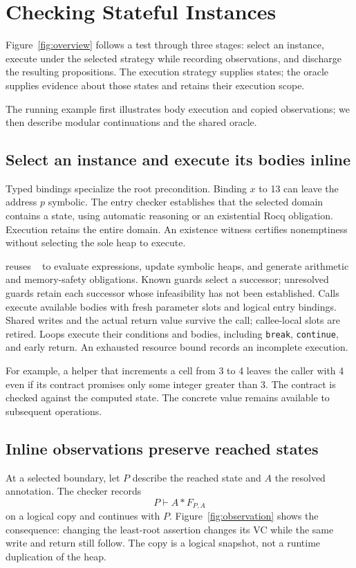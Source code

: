 \section{Checking Stateful Instances}
\label{sec:approach}
Figure~\ref{fig:overview} follows a test through three stages: select an
instance, execute under the selected strategy while recording observations, and discharge
the resulting propositions. The execution strategy supplies states; the oracle
supplies evidence about those states and retains their execution scope.

The running example first illustrates body execution and copied observations;
we then describe modular continuations and the shared oracle.

\subsection{Select an instance and execute its bodies inline}
Typed bindings specialize the root precondition. Binding $x$ to 13 can
leave the address $p$ symbolic. The entry checker establishes that the
selected domain contains a state, using automatic reasoning or an
existential Rocq obligation. Execution retains the entire domain.
An existence witness certifies nonemptiness without selecting the sole
heap to execute.

\tespec{} reuses \qcp{}~\cite{wu2026qcp} to evaluate expressions, update symbolic heaps,
and generate arithmetic and memory-safety obligations.
Known guards select a successor; unresolved guards retain each successor
whose infeasibility has not been established.
Calls execute available bodies with fresh parameter slots and logical
entry bindings. Shared writes and the actual return value survive the
call; callee-local slots are retired. Loops execute their conditions and
bodies, including \texttt{break}, \texttt{continue}, and early return.
An exhausted resource bound records an incomplete execution.

For example, a helper that increments a cell from 3 to 4 leaves the
caller with 4 even if its contract promises only some integer greater
than 3. The contract is checked against the computed state. The concrete
value remains available to subsequent operations.

\subsection{Inline observations preserve reached states}
\label{sec:boundaries}
At a selected boundary, let $P$ describe the reached state and $A$ the
resolved annotation. The checker records
\[
                 P\vdash A*F_{P,A}
\]
on a logical copy and continues with $P$.
Figure~\ref{fig:observation} shows the consequence: changing the least-root
assertion changes its VC while the same write and return still follow.
The copy is a logical snapshot, not a runtime duplication of the heap.


